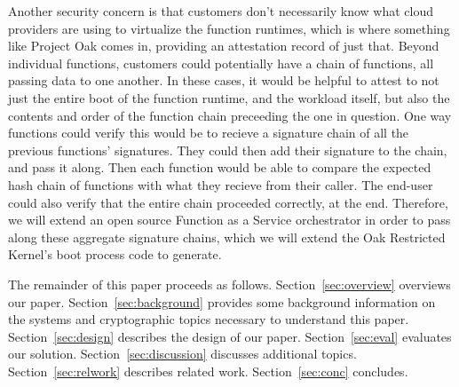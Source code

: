 Another security concern is that customers don't necessarily know what cloud providers are using to virtualize the function runtimes, which is where something like Project Oak comes in, providing an attestation record of just that.
Beyond individual functions, customers could potentially have a chain of functions, all passing data to one another.
In these cases, it would be helpful to attest to not just the entire boot of the function runtime, and the workload itself, but also the contents and order of the function chain preceeding the one in question.
One way functions could verify this would be to recieve a signature chain of all the previous functions' signatures.
They could then add their signature to the chain, and pass it along.
Then each function would be able to compare the expected hash chain of functions with what they recieve from their caller.
The end-user could also verify that the entire chain proceeded correctly, at the end.
Therefore, we will extend an open source Function as a Service orchestrator in order to pass along these aggregate signature chains, which we will extend the Oak Restricted Kernel's boot process code to generate.

The remainder of this paper proceeds as follows.
Section~\ref{sec:overview} overviews our paper.
Section~\ref{sec:background} provides some background information on the systems and cryptographic topics necessary to understand this paper.
Section~\ref{sec:design} describes the design of our paper.
Section~\ref{sec:eval} evaluates our solution.
Section~\ref{sec:discussion} discusses additional topics.
Section~\ref{sec:relwork} describes related work.
Section~\ref{sec:conc} concludes.
